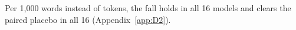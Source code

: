 Per 1,000 words instead of tokens, the fall holds in all 16 models and clears the paired placebo in all 16 (Appendix~\ref{app:D2}).

